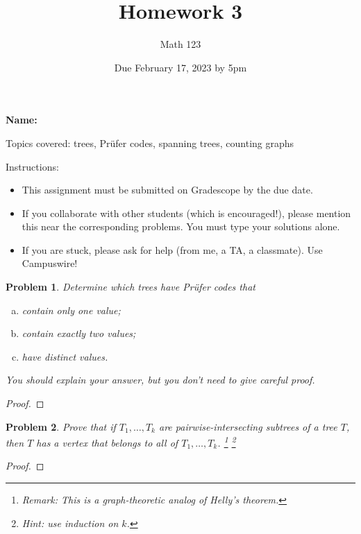 \documentclass[11pt]{article}
\author{Math 123}
\date{Due February 17, 2023 by 5pm}
\title{Homework 3}
\newtheorem{problem}{Problem}
\begin{document}
\maketitle

{\bf\Large Name:} 


\vspace{.3in}
Topics covered: trees, Pr\"ufer codes, spanning trees, counting graphs

Instructions: 
\begin{itemize}
\item This assignment must be submitted on Gradescope by the due date. 
\item If you collaborate with other students (which is encouraged!), please mention this near the corresponding problems. You must type your solutions alone. 
\item If you are stuck, please ask for help (from me, a TA, a classmate). Use Campuswire!  
\end{itemize}
\pagebreak 



\begin{problem}
Determine which trees have Pr\"ufer codes that 
\begin{enumerate}[(a)]
\item contain only one value;
\item contain exactly two values;
\item have distinct values. 
\end{enumerate} 
You should explain your answer, but you don't need to give careful proof. 
\end{problem}

\begin{proof}

\end{proof}


\begin{problem}
Prove that if $T_1,\ldots,T_k$ are pairwise-intersecting subtrees of a tree $T$, then $T$ has a vertex that belongs to all of $T_1,\ldots,T_k$. \footnote{Remark: This is a graph-theoretic analog of Helly's theorem.} \footnote{Hint: use induction on $k$.}
\end{problem}

\begin{proof}

\end{proof}
\end{document}
